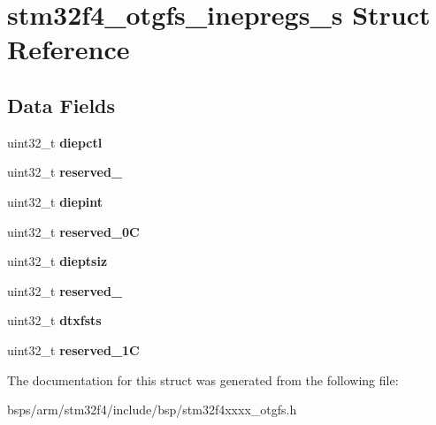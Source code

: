 \hypertarget{structstm32f4__otgfs__inepregs__s}{}\section{stm32f4\+\_\+otgfs\+\_\+inepregs\+\_\+s Struct Reference}
\label{structstm32f4__otgfs__inepregs__s}
\subsection*{Data Fields}
\begin{DoxyCompactItemize}
\item 
\mbox{\label{structstm32f4__otgfs__inepregs__s_a8ee302286fe9c69b7f785b067f8af8c9}} 
uint32\+\_\+t {\bfseries diepctl}
\item 
\mbox{\label{structstm32f4__otgfs__inepregs__s_a6218dd81ba636c1f12bc271fdc6cc7a3}} 
uint32\+\_\+t {\bfseries reserved\+\_}
\item 
\mbox{\label{structstm32f4__otgfs__inepregs__s_a87d8968b4299c4cec8c6fdc0eaf78c66}} 
uint32\+\_\+t {\bfseries diepint}
\item 
\mbox{\label{structstm32f4__otgfs__inepregs__s_a30ab17d5377bf070ba34682dd8057911}} 
uint32\+\_\+t {\bfseries reserved\+\_\+0C}
\item 
\mbox{\label{structstm32f4__otgfs__inepregs__s_a4689635557c4a8eedb08518802f8290b}} 
uint32\+\_\+t {\bfseries dieptsiz}
\item 
\mbox{\label{structstm32f4__otgfs__inepregs__s_aded93870a257fe8f26711f974d365153}} 
uint32\+\_\+t {\bfseries reserved\+\_}
\item 
\mbox{\label{structstm32f4__otgfs__inepregs__s_a959a4c5b9c9bd39332b8f5bc20beee04}} 
uint32\+\_\+t {\bfseries dtxfsts}
\item 
\mbox{\label{structstm32f4__otgfs__inepregs__s_a45eaf83856d0d3303c01c7e85f887e3a}} 
uint32\+\_\+t {\bfseries reserved\+\_\+1C}
\end{DoxyCompactItemize}


The documentation for this struct was generated from the following file\+:\begin{DoxyCompactItemize}
\item 
bsps/arm/stm32f4/include/bsp/stm32f4xxxx\+\_\+otgfs.\+h\end{DoxyCompactItemize}
